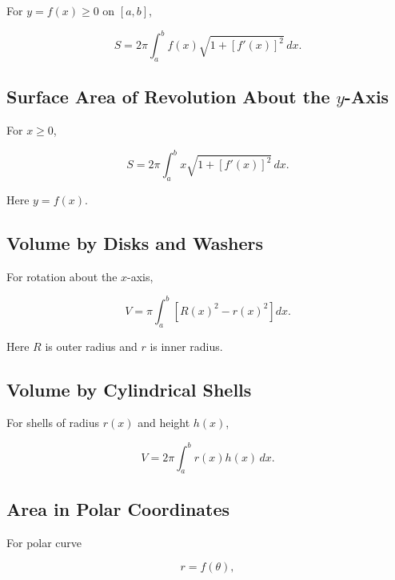 For \(y=f(x)\geq0\) on \([a,b]\),

\[
\boxed{
S
=
2\pi
\int_a^b
f(x)
\sqrt{
1+[f'(x)]^2
}
\,dx.
}
\]

\subsection{Surface Area of Revolution About the \(y\)-Axis}
\label{subsec:surface-area-revolution-y}

For \(x\geq0\),

\[
\boxed{
S
=
2\pi
\int_a^b
x
\sqrt{
1+[f'(x)]^2
}
\,dx.
}
\]

Here \(y=f(x)\).

\subsection{Volume by Disks and Washers}
\label{subsec:disk-washer-volume-reference}

For rotation about the \(x\)-axis,

\[
\boxed{
V
=
\pi
\int_a^b
\left[
R(x)^2-r(x)^2
\right]
dx.
}
\]

Here \(R\) is outer radius and \(r\) is inner radius.

\subsection{Volume by Cylindrical Shells}
\label{subsec:shell-volume-reference}

For shells of radius \(r(x)\) and height \(h(x)\),

\[
\boxed{
V
=
2\pi
\int_a^b
r(x)h(x)\,dx.
}
\]

\subsection{Area in Polar Coordinates}
\label{subsec:polar-area-reference}

For polar curve

\[
r=f(\theta),
\]

